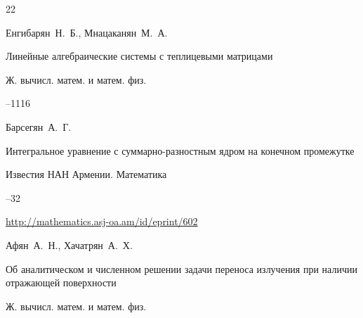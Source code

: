 \begin{thebibliography}{22}






\by Енгибарян~Н.~Б.,  Мнацаканян~М.~А.

\paper Линейные алгебраические системы с теплицевыми матрицами

\jour Ж. вычисл. матем. и матем. физ.




--1116














\by Барсегян~А.~Г.

\paper Интегральное уравнение с суммарно-разностным ядром на конечном промежутке

\jour Известия НАН Армении. Математика 




--32

 \elink \url{http://mathematics.asj-oa.am/id/eprint/602}




\by Афян~А.~Н.,  Хачатрян~А.~Х.

\paper Об аналитическом и численном решении задачи переноса излучения при наличии отражающей поверхности

\jour Ж. вычисл. матем. и матем. физ.





\end{thebibliography}
